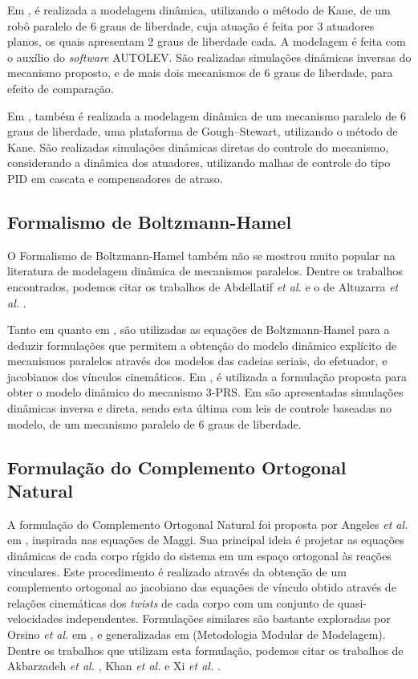 \documentclass[]{politex}
\begin{document}
Em \cite{BenHorina}, é realizada a modelagem dinâmica, utilizando o método de Kane, de um robô paralelo de 6 graus de liberdade, cuja atuação é feita por 3 atuadores planos, os quais apresentam 2 graus de liberdade cada. A modelagem é feita com o auxílio do \emph{software} AUTOLEV. São realizadas simulações dinâmicas inversas do mecanismo proposto, e de mais dois mecanismos de 6 graus de liberdade, para efeito de comparação.

Em \cite{Shukla}, também é realizada a modelagem dinâmica de um mecanismo paralelo de 6 graus de liberdade, uma plataforma de Gough–Stewart, utilizando o método de Kane. São realizadas simulações dinâmicas diretas do controle do mecanismo, considerando a dinâmica dos atuadores, utilizando malhas de controle do tipo PID em cascata e compensadores de atraso.

\subsection{Formalismo de Boltzmann-Hamel}

O Formalismo de Boltzmann-Hamel \cite{Jarzebowska} também não se mostrou muito popular na literatura de modelagem dinâmica de mecanismos paralelos. Dentre os trabalhos encontrados, podemos citar os trabalhos de Abdellatif \emph{et al.} \cite{Abdellatif2} e o de Altuzarra \emph{et al.} \cite{20altuzarra}.

Tanto em \cite{Abdellatif2} quanto em \cite{20altuzarra}, são utilizadas as equações de Boltzmann-Hamel para a deduzir formulações que permitem a obtenção do modelo dinâmico explícito de mecanismos paralelos através dos modelos das cadeias seriais, do efetuador, e jacobianos dos vínculos cinemáticos. Em \cite{20altuzarra}, é utilizada a formulação proposta para obter o modelo dinâmico do mecanismo 3-PRS. Em \cite{Abdellatif2} são apresentadas simulações dinâmicas inversa e direta, sendo esta última com leis de controle baseadas no modelo, de um mecanismo paralelo de 6 graus de liberdade.


\subsection{Formulação do Complemento Ortogonal Natural}

A formulação do Complemento Ortogonal Natural foi proposta por Angeles \emph{et al.} em \cite{Angeles}, inspirada nas equações de Maggi. Sua principal ideia é projetar as equações dinâmicas de cada corpo rígido do sistema em um espaço ortogonal às reações vinculares. Este procedimento é realizado através da obtenção de um complemento ortogonal ao jacobiano das equações de vínculo obtido através de relações cinemáticas dos \emph{twists} de cada corpo com um conjunto de quasi-velocidades independentes. Formulações similares são bastante exploradas por Orsino \emph{et al.} em \cite{22orsino}, e generalizadas em \cite{23orsino} (Metodologia Modular de Modelagem). Dentre os trabalhos que utilizam esta formulação, podemos citar os trabalhos de Akbarzadeh \emph{et al.} \cite{Akbarzadeh}, Khan \emph{et al.} \cite{Khan} e Xi \emph{et al.} \cite{Xi}.
\end{document}
